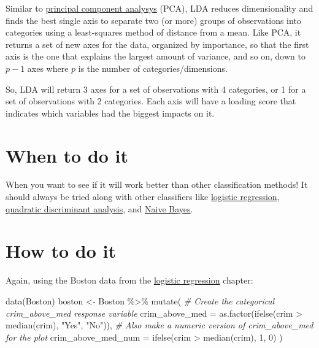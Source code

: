 \documentclass[
]{book}
\newenvironment{Shaded}{\begin{snugshade}}{\end{snugshade}}
\newcommand{\AttributeTok}[1]{\textcolor[rgb]{0.77,0.63,0.00}{#1}}
\newcommand{\CommentTok}[1]{\textcolor[rgb]{0.56,0.35,0.01}{\textit{#1}}}
\newcommand{\DecValTok}[1]{\textcolor[rgb]{0.00,0.00,0.81}{#1}}
\newcommand{\FunctionTok}[1]{\textcolor[rgb]{0.00,0.00,0.00}{#1}}
\newcommand{\NormalTok}[1]{#1}
\newcommand{\OtherTok}[1]{\textcolor[rgb]{0.56,0.35,0.01}{#1}}
\newcommand{\SpecialCharTok}[1]{\textcolor[rgb]{0.00,0.00,0.00}{#1}}
\newcommand{\StringTok}[1]{\textcolor[rgb]{0.31,0.60,0.02}{#1}}
\begin{document}
Similar to \protect\hyperlink{principal-component-analysis}{principal component analysys} (PCA), LDA reduces dimensionality and finds the best single axis to separate two (or more) groups of observations into categories using a least-squares method of distance from a mean. Like PCA, it returns a set of new axes for the data, organized by importance, so that the first axis is the one that explains the largest amount of variance, and so on, down to \(p - 1\) axes where \(p\) is the number of categories/dimensions.

So, LDA will return 3 axes for a set of observations with 4 categories, or 1 for a set of observations with 2 categories. Each axis will have a loading score that indicates which variables had the biggest impacts on it.

\hypertarget{when-to-do-it-3}{%
\section{When to do it}\label{when-to-do-it-3}}

When you want to see if it will work better than other classification methods! It should always be tried along with other classifiers like \protect\hyperlink{logistic-regression}{logistic regression}, \protect\hyperlink{quadratic-discriminant-analysis}{quadratic discriminant analysis}, and \protect\hyperlink{naive-bayes}{Naive Bayes}.

\hypertarget{how-to-do-it-3}{%
\section{How to do it}\label{how-to-do-it-3}}

Again, using the Boston data from the \protect\hyperlink{logistic-regression}{logistic regression} chapter:

\begin{Shaded}
\begin{Highlighting}[]
\FunctionTok{data}\NormalTok{(Boston)}
\NormalTok{boston }\OtherTok{\textless{}{-}}\NormalTok{ Boston }\SpecialCharTok{\%\textgreater{}\%}
  \FunctionTok{mutate}\NormalTok{(}
    \CommentTok{\# Create the categorical crim\_above\_med response variable}
    \AttributeTok{crim\_above\_med =} \FunctionTok{as.factor}\NormalTok{(}\FunctionTok{ifelse}\NormalTok{(crim }\SpecialCharTok{\textgreater{}} \FunctionTok{median}\NormalTok{(crim), }\StringTok{"Yes"}\NormalTok{, }\StringTok{"No"}\NormalTok{)),}
    \CommentTok{\# Also make a numeric version of crim\_above\_med for the plot}
    \AttributeTok{crim\_above\_med\_num =} \FunctionTok{ifelse}\NormalTok{(crim }\SpecialCharTok{\textgreater{}} \FunctionTok{median}\NormalTok{(crim), }\DecValTok{1}\NormalTok{, }\DecValTok{0}\NormalTok{)}
\NormalTok{  )}
\end{Highlighting}
\end{Shaded}
\end{document}
